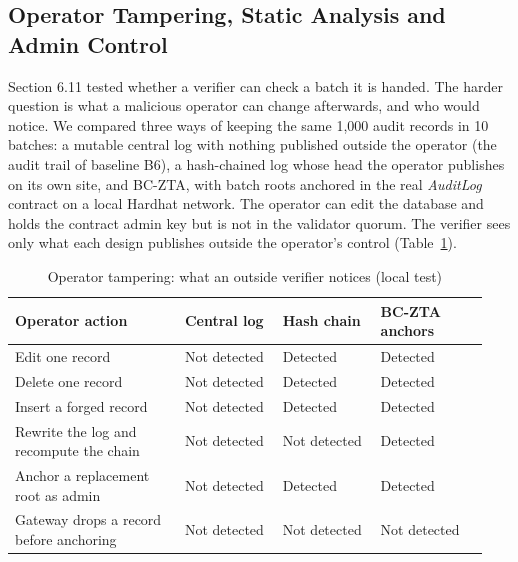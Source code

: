 \documentclass[a4paper,5p,times,twocolumn,number,sort&compress]{elsarticle}
\begin{document}
\subsection{Operator Tampering, Static Analysis and Admin Control}

Section 6.11 tested whether a verifier can check a batch it is handed. The harder question is what a malicious operator can change afterwards, and who would notice. We compared three ways of keeping the same 1,000 audit records in 10 batches: a mutable central log with nothing published outside the operator (the audit trail of baseline B6), a hash-chained log whose head the operator publishes on its own site, and BC-ZTA, with batch roots anchored in the real \emph{AuditLog} contract on a local Hardhat network. The operator can edit the database and holds the contract admin key but is not in the validator quorum. The verifier sees only what each design publishes outside the operator's control (Table~\ref{tab:tamper}).

\begin{table}[!t]
\caption{Operator tampering: what an outside verifier notices (local test)}
\label{tab:tamper}
\footnotesize
\renewcommand{\arraystretch}{0.92}\setlength{\tabcolsep}{2pt}
\begin{tabular}{>{\raggedright\arraybackslash}p{0.332\linewidth}>{\raggedright\arraybackslash}p{0.195\linewidth}>{\raggedright\arraybackslash}p{0.195\linewidth}>{\raggedright\arraybackslash}p{0.214\linewidth}}
\toprule
\textbf{Operator action} & \textbf{Central log} & \textbf{Hash chain} & \textbf{BC-ZTA anchors} \\
\midrule
Edit one record & Not detected & Detected & Detected \\
Delete one record & Not detected & Detected & Detected \\
Insert a forged record & Not detected & Detected & Detected \\
Rewrite the log and recompute the chain & Not detected & Not detected & Detected \\
Anchor a replacement root as admin & Not detected & Detected & Detected \\
Gateway drops a record before anchoring & Not detected & Not detected & Not detected \\
\bottomrule
\end{tabular}
\par\vspace{2pt}{\scriptsize Logic-level comparison on the real AuditLog contract; the verifier rules are ours. It states what each design publishes, not how fast it runs.}
\end{table}
\end{document}

